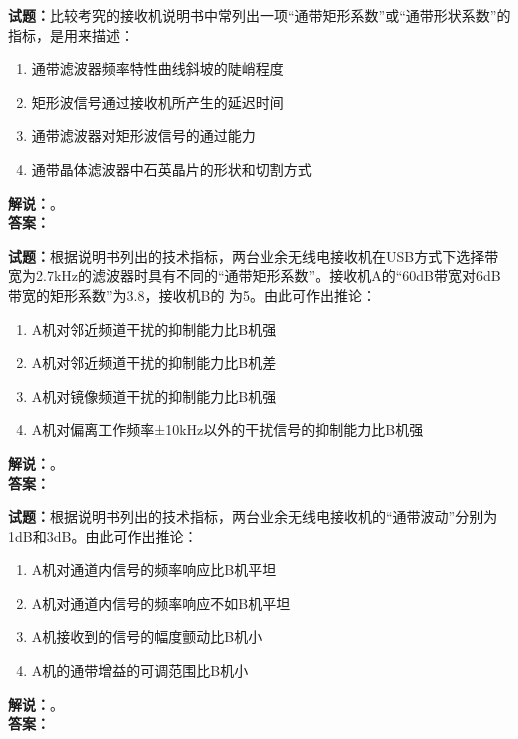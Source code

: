 \documentclass{ctexbook}
\begin{document}
\vspace{\baselineskip}

\noindent\textbf{试题：}比较考究的接收机说明书中常列出一项“通带矩形系数”或“通带形状系数”的指标，是用来描述：
\begin{enumerate}[leftmargin=3em]
  \item 通带滤波器频率特性曲线斜坡的陡峭程度
  \item 矩形波信号通过接收机所产生的延迟时间
  \item 通带滤波器对矩形波信号的通过能力
  \item 通带晶体滤波器中石英晶片的形状和切割方式
\end{enumerate}
\noindent\textbf{解说：}\textbf{}。\\\noindent\textbf{答案：}

\vspace{\baselineskip}

\noindent\textbf{试题：}根据说明书列出的技术指标，两台业余无线电接收机在USB方式下选择带宽为2.7\unit{\kHz}的滤波器时具有不同的“通带矩形系数”。接收机A的“60dB带宽对6dB带宽的矩形系数”为3.8，接收机B的 为5。由此可作出推论：
\begin{enumerate}[leftmargin=3em]
  \item A机对邻近频道干扰的抑制能力比B机强
  \item A机对邻近频道干扰的抑制能力比B机差
  \item A机对镜像频道干扰的抑制能力比B机强
  \item A机对偏离工作频率±10\unit{\kHz}以外的干扰信号的抑制能力比B机强
\end{enumerate}
\noindent\textbf{解说：}\textbf{}。\\\noindent\textbf{答案：}

\vspace{\baselineskip}

\noindent\textbf{试题：}根据说明书列出的技术指标，两台业余无线电接收机的“通带波动”分别为1dB和3dB。由此可作出推论：
\begin{enumerate}[leftmargin=3em]
  \item A机对通道内信号的频率响应比B机平坦
  \item A机对通道内信号的频率响应不如B机平坦
  \item A机接收到的信号的幅度颤动比B机小
  \item A机的通带增益的可调范围比B机小
\end{enumerate}
\noindent\textbf{解说：}\textbf{}。\\\noindent\textbf{答案：}
\end{document}
